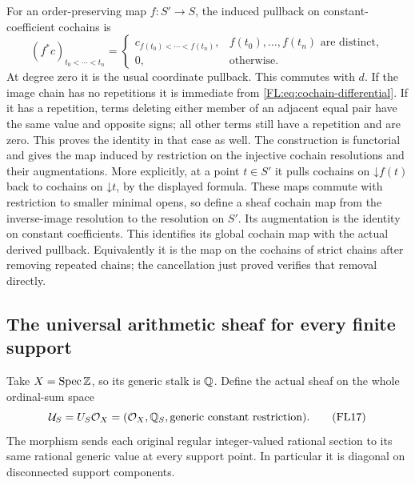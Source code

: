 For an order-preserving map $f:S'\to S$, the induced pullback on
constant-coefficient cochains is
\[
 (f^*c)_{t_0<\cdots<t_n}=
 \begin{cases}
 c_{f(t_0)<\cdots<f(t_n)},&f(t_0),\ldots,f(t_n)\text{ are distinct},\\
 0,&\text{otherwise}.
 \end{cases}
 \tag{FL16}\label{FL:eq:cochain-map}
\]
At degree zero it is the usual coordinate pullback. This commutes
with $d$. If the image chain has no repetitions it is immediate from
\eqref{FL:eq:cochain-differential}. If it has a repetition, terms deleting
either member of an adjacent equal pair have the same value and
opposite signs; all other terms still have a repetition and are zero.
This proves the identity in that case as well. The construction is
functorial and gives the map induced by restriction on the injective
cochain resolutions and their augmentations. More explicitly, at a
point $t\in S'$ it pulls cochains on $\mathord\downarrow f(t)$ back
to cochains on $\mathord\downarrow t$, by the displayed formula.
These maps commute with restriction to smaller minimal opens, so
define a sheaf cochain map from the inverse-image resolution to the
resolution on $S'$. Its augmentation is the identity on constant
coefficients. This identifies its global cochain map with the actual
derived pullback. Equivalently it is the
map on the cochains of strict chains after removing repeated chains;
the cancellation just proved verifies that removal directly.

\subsection{The universal arithmetic sheaf for every finite support}

Take $X=\operatorname{Spec}\mathbb Z$, so its generic stalk is $\mathbb Q$. Define the
actual sheaf on the whole ordinal-sum space
\[
 \mathcal U_S=U_S\mathcal O_X
   =(\mathcal O_X,\mathbb Q_S,\text{generic constant restriction}).
 \tag{FL17}\label{FL:eq:arithmetic-object}
\]
The morphism sends each original regular integer-valued rational
section to its same rational generic value at every support point.
In particular it is diagonal on disconnected support components.

